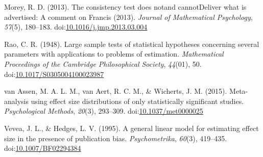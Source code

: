 \documentclass[man,floatsintext]{apa6}
\begin{document}
\leavevmode\hypertarget{ref-morey2013ConsistencyTestDoes}{}%
Morey, R. D. (2013). The consistency test does notand cannotDeliver what is advertised: A comment on Francis (2013). \emph{Journal of Mathematical Psychology}, \emph{57}(5), 180--183. doi:\href{https://doi.org/10.1016/j.jmp.2013.03.004}{10.1016/j.jmp.2013.03.004}

\leavevmode\hypertarget{ref-rao1948LargeSampleTests}{}%
Rao, C. R. (1948). Large sample tests of statistical hypotheses concerning several parameters with applications to problems of estimation. \emph{Mathematical Proceedings of the Cambridge Philosophical Society}, \emph{44}(01), 50. doi:\href{https://doi.org/10.1017/S0305004100023987}{10.1017/S0305004100023987}

\leavevmode\hypertarget{ref-vanassen2015MetaanalysisUsingEffect}{}%
van Assen, M. A. L. M., van Aert, R. C. M., \& Wicherts, J. M. (2015). Meta-analysis using effect size distributions of only statistically significant studies. \emph{Psychological Methods}, \emph{20}(3), 293--309. doi:\href{https://doi.org/10.1037/met0000025}{10.1037/met0000025}

\leavevmode\hypertarget{ref-vevea1995GeneralLinearModel}{}%
Vevea, J. L., \& Hedges, L. V. (1995). A general linear model for estimating effect size in the presence of publication bias. \emph{Psychometrika}, \emph{60}(3), 419--435. doi:\href{https://doi.org/10.1007/BF02294384}{10.1007/BF02294384}

\endgroup
\end{document}
